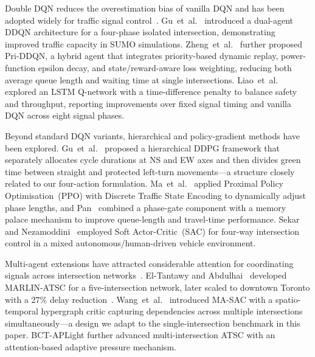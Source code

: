\documentclass[conference]{IEEEtran}
\begin{document}
Double DQN reduces the overestimation bias of vanilla DQN and has
been adopted widely for traffic signal
control~\cite{Gu2020DoubleDQD, Zheng2024PriDDQNLAG}.
Gu~et~al.~\cite{Gu2020DoubleDQD} introduced a dual-agent DDQN
architecture for a four-phase isolated intersection, demonstrating
improved traffic capacity in SUMO simulations.
Zheng~et~al.~\cite{Zheng2024PriDDQNLAG} further proposed Pri-DDQN,
a hybrid agent that integrates priority-based dynamic replay,
power-function epsilon decay, and state/reward-aware loss
weighting, reducing both average queue length and waiting time
at single intersections. Liao~et~al.~\cite{Liao2020TimeDPQ}
explored an LSTM Q-network with a time-difference penalty to
balance safety and throughput, reporting improvements over fixed
signal timing and vanilla DQN across eight signal phases.

Beyond standard DQN variants, hierarchical and policy-gradient
methods have been explored. Gu~et~al.~\cite{Gu2025AHDL} proposed a
hierarchical DDPG framework that separately allocates cycle
durations at NS and EW axes and then divides green time between
straight and protected left-turn movements---a structure closely
related to our four-action formulation.
Ma~et~al.~\cite{Ma2021AdaptiveOOK} applied Proximal Policy
Optimisation~(PPO) with Discrete Traffic State Encoding to
dynamically adjust phase lengths, and Pan~\cite{Pan2023TrafficLCR}
combined a phase-gate component with a memory palace mechanism to
improve queue-length and travel-time performance. Sekar and
Nezamoddini~\cite{Sekar2025OptimizingMIB} employed Soft
Actor-Critic~(SAC) for four-way intersection control in a mixed
autonomous/human-driven vehicle environment.

Multi-agent extensions have attracted considerable attention for
coordinating signals across intersection
networks~\cite{Balaji2010UrbanTSJ, ElTantawy2012MultiAgentRLY,
ElTantawy2013MultiagentRLAG, Wiering2000MultiAgentRLAF,
Xu2013TheSOAL, Kim2019CooperativeTSAB,
Kolat2023MultiAgentRLAN}.
El-Tantawy and Abdulhai~\cite{ElTantawy2012MultiAgentRLY} developed
MARLIN-ATSC for a five-intersection network, later scaled to
downtown Toronto with a 27\% delay
reduction~\cite{ElTantawy2013MultiagentRLAG}.
Wang~et~al.~\cite{Wang2024TowardMRP} introduced MA-SAC with a
spatio-temporal hypergraph critic capturing dependencies across
multiple intersections simultaneously---a design we adapt to the
single-intersection benchmark in this paper. BCT-APLight
\cite{2024BayesianCRT} further advanced multi-intersection ATSC
with an attention-based adaptive pressure mechanism.
\end{document}
